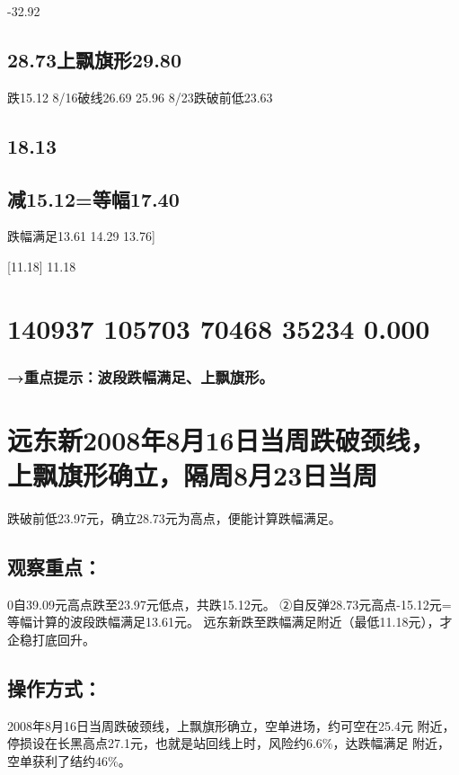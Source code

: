 \documentclass{article}
\begin{document}
-32.92

\subsection{28.73上飘旗形29.80}

跌15.12 8/16破线26.69 25.96 8/23跌破前低23.63

\subsection{18.13}

\subsection{减15.12=等幅17.40}

跌幅满足13.61 14.29 13.76]

[11.18] 11.18

\section{140937 105703 70468 35234 0.000}

\subsubsection{→重点提示：波段跌幅满足、上飘旗形。}

\section{远东新2008年8月16日当周跌破颈线，上飘旗形确立，隔周8月23日当周}

跌破前低23.97元，确立28.73元为高点，便能计算跌幅满足。

\subsection{观察重点：}

0自39.09元高点跌至23.97元低点，共跌15.12元。 ②自反弹28.73元高点-15.12元=等幅计算的波段跌幅满足13.61元。 远东新跌至跌幅满足附近（最低11.18元），才企稳打底回升。

\subsection{操作方式：}

2008年8月16日当周跌破颈线，上飘旗形确立，空单进场，约可空在25.4元 附近，停损设在长黑高点27.1元，也就是站回线上时，风险约6.6\%，达跌幅满足 附近，空单获利了结约46\%。
\end{document}
